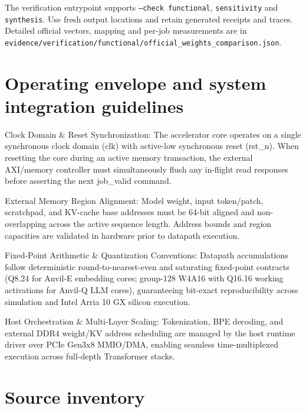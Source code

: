 \documentclass[11pt,a4paper]{article}
\begin{document}
The verification entrypoint supports \texttt{--check functional},\allowbreak{} \texttt{sensitivity} and \texttt{synthesis}. Use fresh output locations and retain generated receipts and traces. Detailed official vectors,\allowbreak{} mapping and per-job measurements are in \texttt{evidence/\allowbreak{}verification/\allowbreak{}functional/\allowbreak{}official\_\allowbreak{}weights\_\allowbreak{}comparison.json}.


\section{Operating envelope and system integration guidelines}

Clock Domain \& Reset Synchronization: The accelerator core operates on a single synchronous clock domain (\allowbreak{}clk)\allowbreak{} with active-low synchronous reset (\allowbreak{}rst\_\allowbreak{}n)\allowbreak{}. When resetting the core during an active memory transaction,\allowbreak{} the external AXI/\allowbreak{}memory controller must simultaneously flush any in-flight read responses before asserting the next job\_\allowbreak{}valid command.


External Memory Region Alignment: Model weight,\allowbreak{} input token/\allowbreak{}patch,\allowbreak{} scratchpad,\allowbreak{} and KV-cache base addresses must be 64-bit aligned and non-overlapping across the active sequence length. Address bounds and region capacities are validated in hardware prior to datapath execution.


Fixed-Point Arithmetic \& Quantization Conventions: Datapath accumulations follow deterministic round-to-nearest-even and saturating fixed-point contracts (\allowbreak{}Q8.24 for Anvil-E embedding cores; group-128 W4A16 with Q16.16 working activations for Anvil-Q LLM cores)\allowbreak{},\allowbreak{} guaranteeing bit-exact reproducibility across simulation and Intel Arria 10 GX silicon execution.


Host Orchestration \& Multi-Layer Scaling: Tokenization,\allowbreak{} BPE decoding,\allowbreak{} and external DDR4 weight/\allowbreak{}KV address scheduling are managed by the host runtime driver over PCIe Gen3x8 MMIO/\allowbreak{}DMA,\allowbreak{} enabling seamless time-multiplexed execution across full-depth Transformer stacks.


\appendix{}\section{Source inventory}
\end{document}
